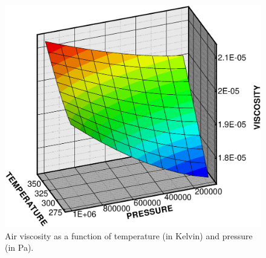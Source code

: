 \begin{figure}[htb!]
\begin{center}
\footnotesize
\includegraphics[width=0.6\columnwidth]{PART_II/G/viscosity.eps}  %
\caption{Air viscosity as a function of temperature (in Kelvin) and pressure (in Pa).}
\label{fig:visco7}
\end{center}
\end{figure}

